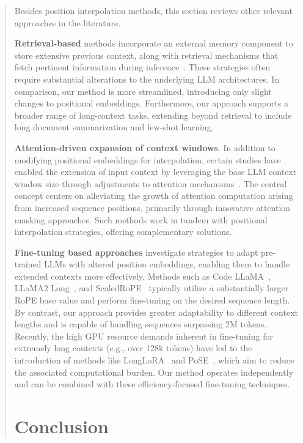 \begin{abstract}
Besides position interpolation methods, this section reviews other relevant approaches in the literature.

\textbf{Retrieval-based} methods incorporate an external memory component to store extensive previous context, along with retrieval mechanisms that fetch pertinent information during inference~\cite{longllama,wang2023augmenting,borgeaud2022improving}. These strategies often require substantial alterations to the underlying LLM architectures. In comparison, our method is more streamlined, introducing only slight changes to positional embeddings. Furthermore, our approach supports a broader range of long-context tasks, extending beyond retrieval to include long document summarization and few-shot learning.

\textbf{Attention-driven expansion of context windows}. In addition to modifying positional embeddings for interpolation, certain studies have enabled the extension of input context by leveraging the base LLM context window size through adjustments to attention mechanisms~\cite{han2023lminfinite, streamingllm,parallelwindow}. The central concept centers on alleviating the growth of attention computation arising from increased sequence positions, primarily through innovative attention masking approaches. Such methods work in tandem with positional interpolation strategies, offering complementary solutions.

\textbf{Fine-tuning based approaches} investigate strategies to adapt pre-trained LLMs with altered position embeddings, enabling them to handle extended contexts more effectively. Methods such as Code LLaMA~\cite{codellama}, LLaMA2 Long~\cite{xiong2023effective}, and ScaledRoPE~\cite{liu2023scaling} typically utilize a substantially larger RoPE base value and perform fine-tuning on the desired sequence length. By contrast, our approach provides greater adaptability to different context lengths and is capable of handling sequences surpassing 2M tokens. Recently, the high GPU resource demands inherent in fine-tuning for extremely long contexts (e.g., over 128k tokens) have led to the introduction of methods like LongLoRA~\cite{longlora} and PoSE~\cite{zhu2023pose}, which aim to reduce the associated computational burden. Our method operates independently and can be combined with these efficiency-focused fine-tuning techniques.

\section{Conclusion}


\end{abstract}
